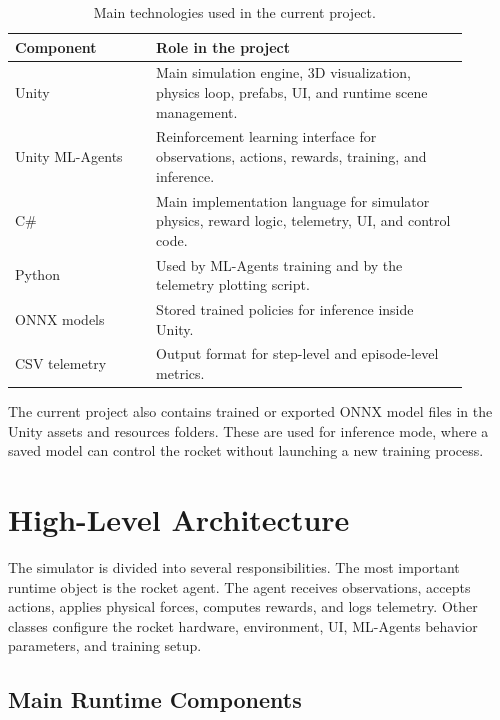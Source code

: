 \documentclass[12pt,a4paper]{article}
\begin{document}
\begin{table}[h]
\centering
\begin{tabular}{p{0.28\linewidth} p{0.62\linewidth}}
\toprule
\textbf{Component} & \textbf{Role in the project} \\
\midrule
Unity & Main simulation engine, 3D visualization, physics loop, prefabs, UI, and runtime scene management. \\
Unity ML-Agents & Reinforcement learning interface for observations, actions, rewards, training, and inference. \\
C\# & Main implementation language for simulator physics, reward logic, telemetry, UI, and control code. \\
Python & Used by ML-Agents training and by the telemetry plotting script. \\
ONNX models & Stored trained policies for inference inside Unity. \\
CSV telemetry & Output format for step-level and episode-level metrics. \\
\bottomrule
\end{tabular}
\caption{Main technologies used in the current project.}
\end{table}

The current project also contains trained or exported ONNX model files in the Unity assets and resources folders. These are used for inference mode, where a saved model can control the rocket without launching a new training process.

\section{High-Level Architecture}

The simulator is divided into several responsibilities. The most important runtime object is the rocket agent. The agent receives observations, accepts actions, applies physical forces, computes rewards, and logs telemetry. Other classes configure the rocket hardware, environment, UI, ML-Agents behavior parameters, and training setup.

\subsection{Main Runtime Components}
\end{document}
